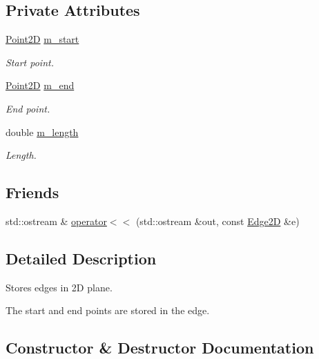 \subsection*{Private Attributes}
\begin{DoxyCompactItemize}
\item 
\hyperlink{classcmst_1_1_point2_d}{Point2D} \hyperlink{classcmst_1_1_edge2_d_a8c0ca77824a84a48c714aaec5da72ad7}{m\_start}
\begin{DoxyCompactList}\small\item\em Start point. \end{DoxyCompactList}\item 
\hyperlink{classcmst_1_1_point2_d}{Point2D} \hyperlink{classcmst_1_1_edge2_d_a26aabda4fcc506ae340392e78f92e49b}{m\_end}
\begin{DoxyCompactList}\small\item\em End point. \end{DoxyCompactList}\item 
double \hyperlink{classcmst_1_1_edge2_d_ab461fb636aa7f76af613c63c681c186e}{m\_length}
\begin{DoxyCompactList}\small\item\em Length. \end{DoxyCompactList}\end{DoxyCompactItemize}
\subsection*{Friends}
\begin{DoxyCompactItemize}
\item 
std::ostream \& \hyperlink{classcmst_1_1_edge2_d_ae312c205375d240b1c8bc889f2c1c55e}{operator$<$$<$} (std::ostream \&out, const \hyperlink{classcmst_1_1_edge2_d}{Edge2D} \&e)
\end{DoxyCompactItemize}


\subsection{Detailed Description}
Stores edges in 2D plane.

The start and end points are stored in the edge. 

\subsection{Constructor \& Destructor Documentation}
